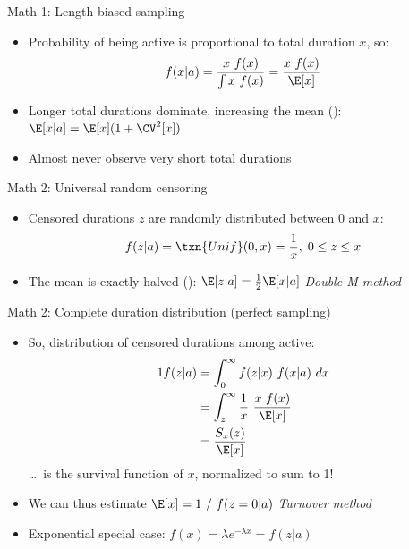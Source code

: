 \begin{frame}[t]{Math 1: Length-biased sampling}
  \begin{itemize}
    \item Probability of being active is proportional to total duration $x$, so:
          \[ f(x|a) = \frac{x~f(x)}{\int x~f(x)} = \frac{x~f(x)}{\E[x]} \]
    \item Longer total durations dominate, increasing the mean (): \;$\E[x|a] = \E[x] (1 + \CV^2[x])$
    \item Almost never observe very short total durations
  \end{itemize}
\end{frame}
\begin{frame}[t]{Math 2: Universal random censoring}
  \begin{itemize}
    \item Censored durations $z$ are randomly distributed between $0$ and $x$:
          \[ f(z|a) = \txn{Unif}(0,x) = \frac1x,\; 0 \le z \le x \]
    \item The mean is exactly halved (): \;$\E[z|a] = \frac12\E[x|a]$ \quad\rarr \emph{Double-M method}
  \end{itemize}
\end{frame}
\begin{frame}[t]{Math 2: Complete duration distribution (perfect sampling)}
  \begin{itemize}
    \item So, distribution of censored durations among active:
    \begin{alignat}1
      f(z|a) &= \int_0^\infty f(z|x) ~ f(x|a) ~ dx \\
             &= \int_z^\infty \frac1x ~ \frac{x~f(x)}{\E[x]} \\
             &= \frac{S_x(z)}{\E[x]}
    \end{alignat}
    \dots~is the survival function of $x$, normalized to sum to 1!
    \item We can thus estimate $\E[x] = 1~/~f(z=0|a)$ \quad\rarr \emph{Turnover method}
    \item Exponential special case: $f(x) = \lambda e^{-\lambda x} = f(z|a)$
  \end{itemize}
\end{frame}
